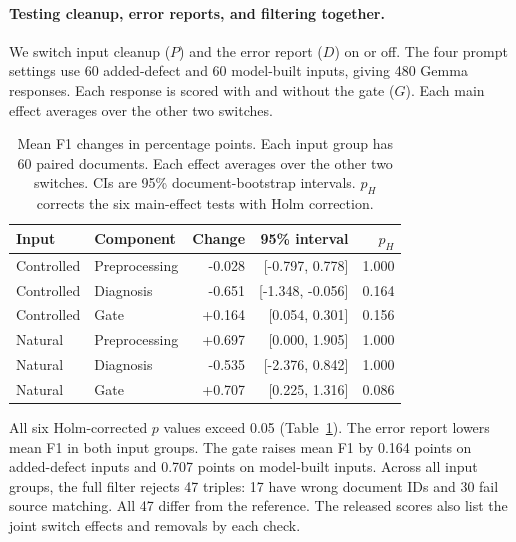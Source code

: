 \paragraph{Testing cleanup, error reports, and filtering together.}
\label{sec:eval:factorial}

We switch input cleanup ($P$) and the error report ($D$) on or off.
The four prompt settings use 60 added-defect and 60 model-built inputs,
giving 480 Gemma responses. Each response is scored with and without the
gate ($G$). Each main effect averages over the other two switches.

\begin{table}[t]

\centering

\caption{Mean F1 changes in percentage points. Each input group has 60 paired documents. Each effect averages over the other two switches. CIs are 95\% document-bootstrap intervals. $p_H$ corrects the six main-effect tests with Holm correction.}
\label{tab:recovery_factorial}

\small

\begin{tabular}{llrrr}

\toprule

Input & Component & Change & 95\% interval & $p_H$ \\

\midrule

Controlled & Preprocessing & -0.028 & [-0.797, 0.778] & 1.000 \\

Controlled & Diagnosis & -0.651 & [-1.348, -0.056] & 0.164 \\

Controlled & Gate & +0.164 & [0.054, 0.301] & 0.156 \\

Natural & Preprocessing & +0.697 & [0.000, 1.905] & 1.000 \\

Natural & Diagnosis & -0.535 & [-2.376, 0.842] & 1.000 \\

Natural & Gate & +0.707 & [0.225, 1.316] & 0.086 \\

\bottomrule

\end{tabular}

\end{table}

All six Holm-corrected $p$ values exceed 0.05
(Table~\ref{tab:recovery_factorial}). The error report lowers mean F1
in both input groups. The gate raises mean F1 by 0.164 points on
added-defect inputs and 0.707 points on model-built inputs.
Across all input groups, the full filter rejects 47 triples:
17 have wrong document IDs and 30 fail source matching.
All 47 differ from the reference. The released scores also list the joint
switch effects and removals by each check.
